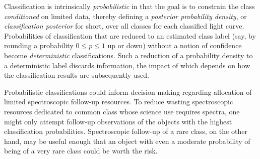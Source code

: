 Classification is intrinsically \textit{probabilistic} in that the goal is to constrain the class \textit{conditioned} on limited data, thereby defining a \textit{posterior probability density}, or \textit{classification posterior} for short, over all classes for each classified light curve.
Probabilities of classification that are reduced to an estimated class label (say, by rounding a probability $0 \leq p \leq 1$ up or down) without a notion of confidence become \textit{deterministic} classifications.
Such a reduction of a probability density to a deterministic label discards information, the impact of which depends on how the classification results are subsequently used.

Probabilistic classifications could inform decision making regarding allocation of limited spectroscopic follow-up resources.
To reduce wasting spectroscopic resources dedicated to common class whose science use requires spectra, one might only attempt follow-up observations of the objects with the highest classification probabilities.
Spectroscopic follow-up of a rare class, on the other hand, may be useful enough that an object with even a moderate probability of being of a very rare class could be worth the risk.

